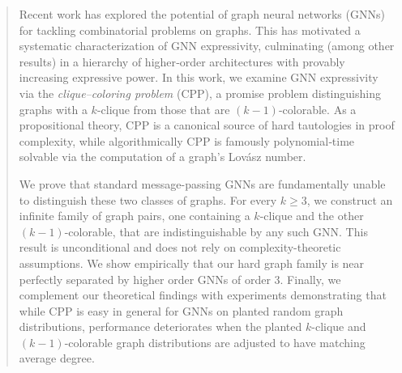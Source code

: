 \begin{abstract}
    Recent work has explored the potential of graph neural networks (GNNs) for tackling combinatorial problems on graphs. This has motivated a systematic characterization of GNN expressivity, culminating (among other results) in a hierarchy of higher‑order architectures with provably increasing expressive power. In this work, we examine GNN expressivity via the \emph{clique--coloring problem} (CPP), a promise problem distinguishing graphs with a $k$-clique from those that are $(k\!-\!1)$-colorable. As a propositional theory, CPP is a canonical source of hard tautologies in proof complexity, while algorithmically CPP is famously polynomial‑time solvable via the computation of a graph's Lovász number.

    We prove that standard message-passing GNNs are fundamentally unable to distinguish these two classes of graphs. For every $k \ge 3$, we construct an infinite family of graph pairs, one containing a $k$-clique and the other $(k\!-\!1)$-colorable, that are indistinguishable by any such GNN. This result is unconditional and does not rely on complexity-theoretic assumptions. We show empirically that our hard graph family is near perfectly separated by higher order GNNs of order 3. Finally, we complement our theoretical findings with experiments demonstrating that while CPP is easy in general for GNNs on planted random graph distributions, performance deteriorates when the planted $k$-clique and $(k\!-\!1)$-colorable graph distributions are adjusted to have matching average degree.

\end{abstract}